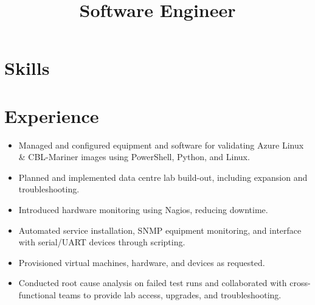 \documentclass[11pt,sans]{moderncv}
\title{Software Engineer}
\begin{document}
\maketitle
\section{Skills}
\section{Experience}
\newline{}
\begin{itemize}
\item Managed and configured equipment and software for validating Azure Linux \& CBL-Mariner images using PowerShell, Python, and Linux.
\item Planned and implemented data centre lab build-out, including expansion and troubleshooting.
\item Introduced hardware monitoring using Nagios, reducing downtime.
\item Automated service installation, SNMP equipment monitoring, and interface with serial/UART devices through scripting.
\item Provisioned virtual machines, hardware, and devices as requested.
\item Conducted root cause analysis on failed test runs and collaborated with cross-functional teams to provide lab access, upgrades, and troubleshooting.\newline{}
\end{itemize}
\newline{}
\end{document}
